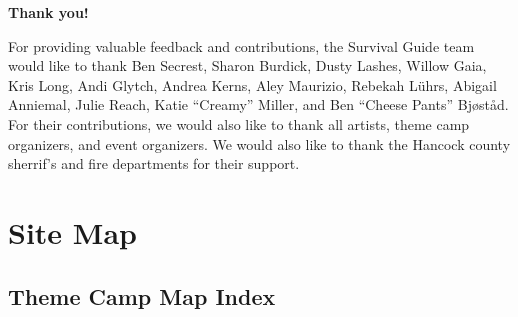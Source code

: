 \clearpage

\vspace*{\fill}
\begin{center}
\Large
\textbf{Thank you!}
\end{center}



\shapepar{\heartshape}
For providing valuable feedback and contributions, the Survival Guide team would like to thank Ben Secrest, Sharon Burdick, Dusty Lashes, Willow Gaia, Kris Long, Andi Glytch, Andrea Kerns, Aley Maurizio, Rebekah Lührs, Abigail Anniemal, Julie Reach,  Katie ``Creamy'' Miller, and Ben ``Cheese Pants'' Bj{\o}st{\aa}d. For their contributions, we would also like to thank all artists, theme camp organizers, and event organizers.  We would also like to thank the Hancock county sherrif's and fire departments for their support.

\vspace*{\fill}


\chapter{Site Map}

\section*{Theme Camp Map Index}
